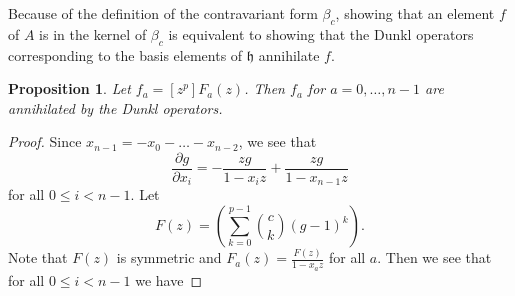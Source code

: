 \documentclass{article}
\numberwithin{equation}{section}
\newtheorem{proposition}[equation]{Proposition}
\newcommand{\h}{\mathfrak{h}}
\begin{document}
Because of the definition of the contravariant form $\beta_c$, showing that an element $f$ of $A$ is in the kernel of $\beta_c$ is equivalent to showing that the Dunkl operators corresponding to the basis elements of $\h$ annihilate $f$.

\begin{proposition}\label{prop:ann} Let $f_a=[z^p]F_a(z)$. Then $f_a$ for $a=0,\dots,n-1$ are annihilated by the Dunkl operators. 
\end{proposition}

\begin{proof}
%
%

Since $x_{n-1}=-x_0-\dots-x_{n-2}$, we see that $$\frac{\partial g}{\partial x_i}=-\frac{zg}{1-x_iz}+\frac{zg}{1-x_{n-1}z}$$ for all $0 \le i < n-1$. Let $$F(z) =\left(\sum_{k=0}^{p-1} \binom{c}{k} (g-1)^k\right).$$ Note that $F(z)$ is symmetric and $F_a(z)=\frac{F(z)}{1-x_az}$ for all $a$. Then we see that for all $0 \le i < n-1$ we have


\end{proof}
\end{document}

